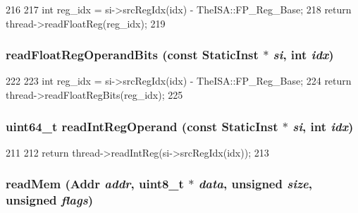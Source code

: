 \begin{DoxyCode}
216     {
217         int reg_idx = si->srcRegIdx(idx) - TheISA::FP_Reg_Base;
218         return thread->readFloatReg(reg_idx);
219     }
\end{DoxyCode}
\hypertarget{classCheckerCPU_a39d93624e4481f4a210f2c46ea6b15b0}{
\subsubsection[{readFloatRegOperandBits}]{ readFloatRegOperandBits (const {\bf StaticInst} $\ast$ {\em si}, \/  int {\em idx})}}
\label{classCheckerCPU_a39d93624e4481f4a210f2c46ea6b15b0}



\begin{DoxyCode}
222     {
223         int reg_idx = si->srcRegIdx(idx) - TheISA::FP_Reg_Base;
224         return thread->readFloatRegBits(reg_idx);
225     }
\end{DoxyCode}
\hypertarget{classCheckerCPU_a9e7b0a4d5373c48902425c9456b19e7e}{
\subsubsection[{readIntRegOperand}]{\setlength{\rightskip}{0pt plus 5cm}uint64\_\-t readIntRegOperand (const {\bf StaticInst} $\ast$ {\em si}, \/  int {\em idx})}}
\label{classCheckerCPU_a9e7b0a4d5373c48902425c9456b19e7e}



\begin{DoxyCode}
211     {
212         return thread->readIntReg(si->srcRegIdx(idx));
213     }
\end{DoxyCode}
\hypertarget{classCheckerCPU_a66191b2d8a45050b7df3c3efa7bb07c6}{
\subsubsection[{readMem}]{ readMem ({\bf Addr} {\em addr}, \/  uint8\_\-t $\ast$ {\em data}, \/  unsigned {\em size}, \/  unsigned {\em flags})}}
\label{classCheckerCPU_a66191b2d8a45050b7df3c3efa7bb07c6}



